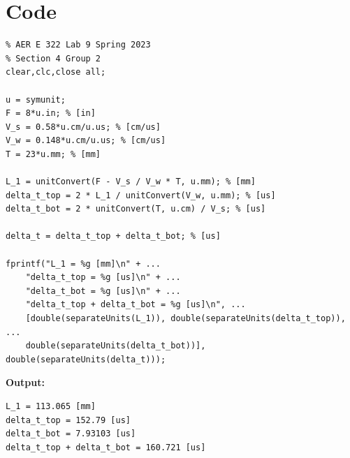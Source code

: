 \documentclass[12 pt]{report}
\begin{document}
\chapter{Code} \label{apdx:code}
\begin{verbatim}
% AER E 322 Lab 9 Spring 2023
% Section 4 Group 2
clear,clc,close all;

u = symunit;
F = 8*u.in; % [in]
V_s = 0.58*u.cm/u.us; % [cm/us]
V_w = 0.148*u.cm/u.us; % [cm/us]
T = 23*u.mm; % [mm]

L_1 = unitConvert(F - V_s / V_w * T, u.mm); % [mm]
delta_t_top = 2 * L_1 / unitConvert(V_w, u.mm); % [us]
delta_t_bot = 2 * unitConvert(T, u.cm) / V_s; % [us]

delta_t = delta_t_top + delta_t_bot; % [us]

fprintf("L_1 = %g [mm]\n" + ...
    "delta_t_top = %g [us]\n" + ...
    "delta_t_bot = %g [us]\n" + ...
    "delta_t_top + delta_t_bot = %g [us]\n", ...
    [double(separateUnits(L_1)), double(separateUnits(delta_t_top)), ...
    double(separateUnits(delta_t_bot))], double(separateUnits(delta_t)));
\end{verbatim}

\textbf{Output:}

\begin{verbatim}
L_1 = 113.065 [mm]
delta_t_top = 152.79 [us]
delta_t_bot = 7.93103 [us]
delta_t_top + delta_t_bot = 160.721 [us]
\end{verbatim}
\end{document}
